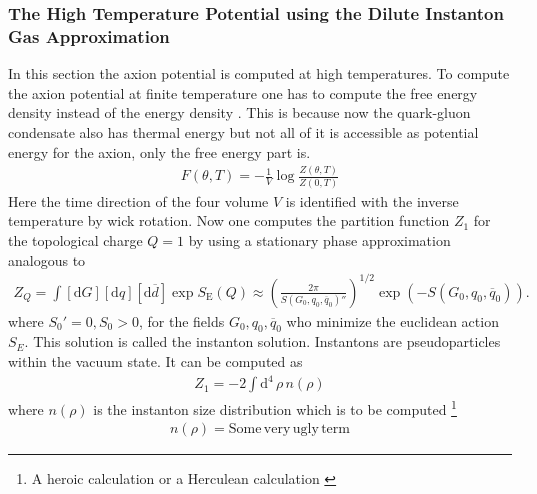 \documentclass[a4paper, 12pt]{article}
\newcommand{\diff}{\mathrm{d}}
\begin{document}
\subsubsection{The High Temperature Potential using the Dilute Instanton Gas Approximation}
\label{sec:DIGA}
In this section the axion potential is computed at high temperatures.
To compute the axion potential at finite temperature one has to
compute the free energy density instead of the energy density \cite[Eq. 2.10]{FiniteTempQCD}.
This is because now the quark-gluon condensate also has thermal energy but not all of it is accessible as potential energy for the axion, only the free energy part is.
\begin{align*}
    F(\theta, T) = - \frac{1}{V} \log \frac{Z(\theta, T)}{Z(0, T)}
\end{align*}
Here the time direction of the four volume $V$ is identified with the inverse temperature by wick rotation.
Now one computes the partition function $Z_1$ for the topological charge $Q = 1$ by using a stationary phase approximation
analogous to
\begin{align*}
    Z_Q = \int [\diff G] [\diff q] [\diff \overline{d}] \exp S_\mathrm{E}(Q) \approx
    \left(  \frac{2 \pi}{S(G_0, q_0, \overline{q}_0)''}  \right)^{1/2} \exp \left( - S(G_0, q_0, \overline{q}_0) \right).
\end{align*}
where $S_0' = 0, S_0 > 0$,
for the fields $G_0, q_0, \overline{q}_0$ who minimize the euclidean action $S_E$. This solution is called the instanton solution.
Instantons are pseudoparticles within the vacuum state.
It can be computed as \cite[Sec. VI]{FiniteTempQCD}
\begin{align*}
    Z_1 = -2 \int \diff^4 \, \rho \, n(\rho)
\end{align*}
where $n(\rho)$ is the instanton size distribution
which is to be computed \footnote{A heroic calculation or a Herculean calculation \cite[Page 346]{Instantons}}
\cite{thooft_PhysRevD.14.3432}
\begin{align*}
    n(\rho) = \mathrm{Some\,very\,ugly\,term}
\end{align*}
\end{document}
